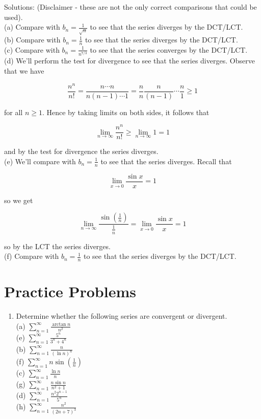 \documentclass[10pt]{article}
\begin{document}
Solutions: (Disclaimer - these are not the only correct comparisons that could be used).\\
(a) Compare with $b_{n}=\frac{1}{\sqrt{n}}$ to see that the series diverges by the DCT/LCT.\\
(b) Compare with $b_{n}=\frac{1}{n}$ to see that the series diverges by the DCT/LCT.\\
(c) Compare with $b_{n}=\frac{1}{n^{7 / 3}}$ to see that the series converges by the DCT/LCT.\\
(d) We'll perform the test for divergence to see that the series diverges. Observe that we have

$$
\frac{n^{n}}{n!}=\frac{n \cdots n}{n(n-1) \cdots 1}=\frac{n}{n} \frac{n}{(n-1)} \cdots \frac{n}{1} \geq 1
$$

for all $n \geq 1$. Hence by taking limits on both sides, it follows that

$$
\lim _{n \rightarrow \infty} \frac{n^{n}}{n!} \geq \lim _{n \rightarrow \infty} 1=1
$$

and by the test for divergence the series diverges.\\
(e) We'll compare with $b_{n}=\frac{1}{n}$ to see that the series diverges. Recall that

$$
\lim _{x \rightarrow 0} \frac{\sin x}{x}=1
$$

so we get

$$
\lim _{n \rightarrow \infty} \frac{\sin \left(\frac{1}{n}\right)}{\frac{1}{n}}=\lim _{x \rightarrow 0} \frac{\sin x}{x}=1
$$

so by the LCT the series diverges.\\
(f) Compare with $b_{n}=\frac{1}{n}$ to see that the series diverges by the DCT/LCT.

\section*{Practice Problems}
\begin{enumerate}
  \item Determine whether the following series are convergent or divergent.\\
(a) $\sum_{n=1}^{\infty} \frac{\arctan n}{n^{2}}$\\
(e) $\sum_{n=1}^{\infty} \frac{5^{n}}{3^{n}+4^{n}}$\\
(b) $\sum_{n=1}^{\infty} \frac{n}{(\ln n)^{n}}$\\
(f) $\sum_{n=1}^{\infty} n \sin \left(\frac{1}{n}\right)$\\
(c) $\sum_{n=1}^{\infty} \frac{\ln n}{n}$\\
(g) $\sum_{n=1}^{\infty} \frac{n \sin n}{n^{2}+1}$\\
(d) $\sum_{n=1}^{\infty} \frac{n^{2} 2^{n-1}}{5^{n}}$\\
(h) $\sum_{n=1}^{\infty} \frac{n^{2}}{(2 n+7)^{3}}$
\end{enumerate}
\end{document}
